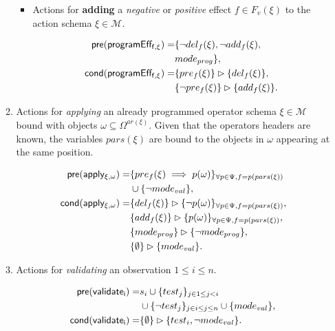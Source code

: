 \documentclass{article}
\newcommand{\pre}{\mathsf{pre}}     %
\newcommand{\cond}{\mathsf{cond}}   %
\begin{document}
\begin{itemize}
\begin{enumerate}
\begin{itemize}
\item Actions for {\bf adding} a {\em negative} or {\em positive} effect $f\in F_v(\xi)$ to the action schema $\xi\in\mathcal{M}$.

\begin{small}
\begin{align*}
\hspace*{7pt}\pre(\mathsf{programEff_{f,\xi}})=&\{\neg del_{f}(\xi),\neg add_{f}(\xi),\\
& mode_{prog}\},\\
\cond(\mathsf{programEff_{f,\xi}})=&\{pre_{f}(\xi)\}\rhd\{del_{f}(\xi)\},\\
&\{\neg pre_{f}(\xi)\}\rhd\{add_{f}(\xi)\}.
\end{align*}
\end{small}
\end{itemize}

\item Actions for {\em applying} an already programmed operator schema $\xi\in\mathcal{M}$ bound with objects $\omega\subseteq\Omega^{ar(\xi)}$. Given that the operators headers are known, the variables $pars(\xi)$ are bound to the objects in $\omega$ appearing at the same position. 
\begin{small}
\begin{align*}
\hspace*{7pt}\pre(\mathsf{apply_{\xi,\omega}})=&\{pre_{f}(\xi)\implies p(\omega)\}_{\forall p\in\Psi,f=p(pars(\xi))}\\
&\cup \{\neg mode_{val}\},\\
\cond(\mathsf{apply_{\xi,\omega}})=&\{del_{f}(\xi)\}\rhd\{\neg p(\omega)\}_{\forall p\in\Psi,f=p(pars(\xi))},\\
&\{add_{f}(\xi)\}\rhd\{p(\omega)\}_{\forall p\in\Psi,f=p(pars(\xi))},\\
&\{mode_{prog}\}\rhd\{\neg mode_{prog}\},\\
&\{\emptyset\}\rhd\{mode_{val}\}.
\end{align*}
\end{small}

\item Actions for {\em validating} an observation {\tt\small $1\leq i\leq n$}.
\begin{small}
\begin{align*}
\hspace*{7pt}\pre(\mathsf{validate_{i}})=&s_i\cup\{test_j\}_{j\in 1\leq j<i}\\
&\cup\{\neg test_j\}_{j\in i\leq j\leq n}\cup \{mode_{val}\},\\
\cond(\mathsf{validate_{i}})=&\{\emptyset\}\rhd\{test_i,\neg mode_{val}\}.
\end{align*}
\end{small}
\end{enumerate}
\end{itemize}
\end{document}
